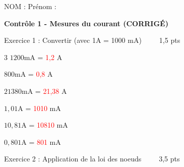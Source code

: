 \documentclass[11pt,a4paper]{article}
\newcommand{\rouge}[1]{\textcolor{red}{#1}}
\begin{document}
\begin{mybox1}
NOM : \hfill Prénom : \hfill ~~
\end{mybox1}

\vfill
\begin{mybox}
\begin{center}
\textbf{\Large Contrôle 1 - Mesures du courant (CORRIGÉ)}
\end{center}
\end{mybox}

\vfill 

\begin{mybox1}
Exercice 1 : Convertir (avec 1A = 1000 mA) ~ \hfill ~~ 1,5 pts
\end{mybox1}

\vspace{3mm}

\begin{multicols}{3}
$1200$mA = \rouge{1,2} A 
\vspace{5mm}

$800$mA = \rouge{0,8} A 
\vspace{5mm}

$21380$mA = \rouge{21,38} A 
\vspace{5mm}

$1,01$A = \rouge{1010} mA
\vspace{5mm}

$10,81$A = \rouge{10810} mA
\vspace{5mm}

$0,801$A = \rouge{801} mA
\vspace{5mm}
\end{multicols}

\begin{mybox1}
Exercice 2 : Application de la loi des noeuds ~ \hfill ~~ 3,5 pts
\end{mybox1}
\end{document}
